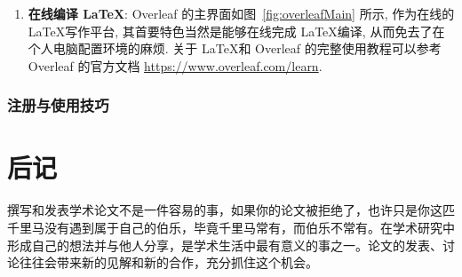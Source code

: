 \documentclass{formatBook}
\begin{document}
\begin{enumerate}
    \item \textbf{在线编译 \LaTeX }: Overleaf 的主界面如图~\ref{fig:overleafMain} 所示, 作为在线的 \LaTeX 写作平台, 其首要特色当然是能够在线完成 \LaTeX 编译, 从而免去了在个人电脑配置环境的麻烦. 关于 \LaTeX 和 Overleaf 的完整使用教程可以参考 Overleaf 的官方文档 \url{https://www.overleaf.com/learn}.
\end{enumerate}

\subsection{注册与使用技巧}
% 
\chapter{后记}
撰写和发表学术论文不是一件容易的事，如果你的论文被拒绝了，也许只是你这匹千里马没有遇到属于自己的伯乐，毕竟千里马常有，而伯乐不常有。在学术研究中形成自己的想法并与他人分享，是学术生活中最有意义的事之一。论文的发表、讨论往往会带来新的见解和新的合作，充分抓住\cite{huang_morleywangxu_2021}这个机会。


\printbibliography
\end{document}
